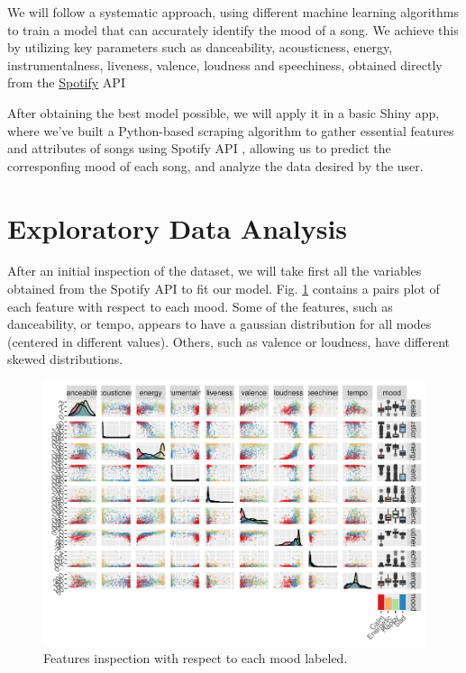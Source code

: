 \documentclass[11pt,]{article}
\begin{document}
We will follow a systematic approach, using different machine learning
algorithms to train a model that can accurately identify the mood of a
song. We achieve this by utilizing key parameters such as danceability,
acousticness, energy, instrumentalness, liveness, valence, loudness and
speechiness, obtained directly from the
\href{https://open.spotify.com/intl-es}{Spotify} API
\citep{spotifydeveloper}

After obtaining the best model possible, we will apply it in a basic
Shiny app, where we've built a Python-based scraping algorithm to gather
essential features and attributes of songs using Spotify API
\citep{spotifydeveloper}, allowing us to predict the corresponfing mood
of each song, and analyze the data desired by the user.

\hypertarget{exploratory-data-analysis}{%
\section{Exploratory Data Analysis}\label{exploratory-data-analysis}}

After an initial inspection of the dataset, we will take first all the
variables obtained from the Spotify API to fit our model. Fig.
\ref{fig:features} contains a pairs plot of each feature with respect to
each mood. Some of the features, such as danceability, or tempo, appears
to have a gaussian distribution for all modes (centered in different
values). Others, such as valence or loudness, have different skewed
distributions.

\begin{figure}[H]
\includegraphics{figs/features} \caption{Features inspection with respect to each mood labeled.}\label{fig:features}
\end{figure}
\end{document}
